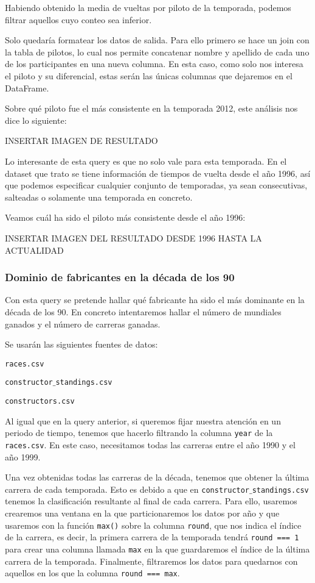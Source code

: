\documentclass[12pt,twoside,titlepage]{report}
\begin{document}
Habiendo obtenido la media de vueltas por piloto de la temporada, podemos filtrar aquellos cuyo conteo sea inferior.


Solo quedaría formatear los datos de salida. Para ello primero se hace un join con la tabla de pilotos, lo cual nos permite concatenar nombre y apellido de cada uno de los participantes en una nueva columna. En esta caso, como solo nos interesa el piloto y su diferencial, estas serán las únicas columnas que dejaremos en el DataFrame.

Sobre qué piloto fue el más consistente en la temporada 2012, este análisis nos dice lo siguiente:

INSERTAR IMAGEN DE RESULTADO 

Lo interesante de esta query es que no solo vale para esta temporada. En el dataset que trato se tiene información de tiempos de vuelta desde el año 1996, así que podemos especificar cualquier conjunto de temporadas, ya sean consecutivas, salteadas o solamente una temporada en concreto.

Veamos cuál ha sido el piloto más consistente desde el año 1996:

INSERTAR IMAGEN DEL RESULTADO DESDE 1996 HASTA LA ACTUALIDAD


\subsubsection{Dominio de fabricantes en la década de los 90}

Con esta query se pretende hallar qué fabricante ha sido el más dominante en la década de los 90. En concreto intentaremos hallar el número de mundiales ganados y el número de carreras ganadas.

Se usarán las siguientes fuentes de datos:
\begin{compactitem}
  \item \texttt{races.csv}
  \item \texttt{constructor$\_$standings.csv}
  \item \texttt{constructors.csv}
\end{compactitem}

Al igual que en la query anterior, si queremos fijar nuestra atención en un periodo de tiempo, tenemos que hacerlo filtrando la columna \texttt{year} de la \texttt{races.csv}. En este caso, necesitamos todas las carreras entre el año 1990 y el año 1999.

Una vez obtenidas todas las carreras de la década, tenemos que obtener la última carrera de cada temporada. Esto es debido a que en \newline\texttt{constructor$\_$standings.csv} tenemos la clasificación resultante al final de cada carrera. Para ello, usaremos crearemos una ventana en la que particionaremos los datos por año y que usaremos con la función \texttt{max()} sobre la columna \texttt{round}, que nos indica el índice de la carrera, es decir, la primera carrera de la temporada tendrá \texttt{round === 1} para crear una columna llamada \texttt{max} en la que guardaremos el índice de la última carrera de la temporada. Finalmente, filtraremos los datos para quedarnos con aquellos en los que la columna \texttt{round === max}.
\end{document}

